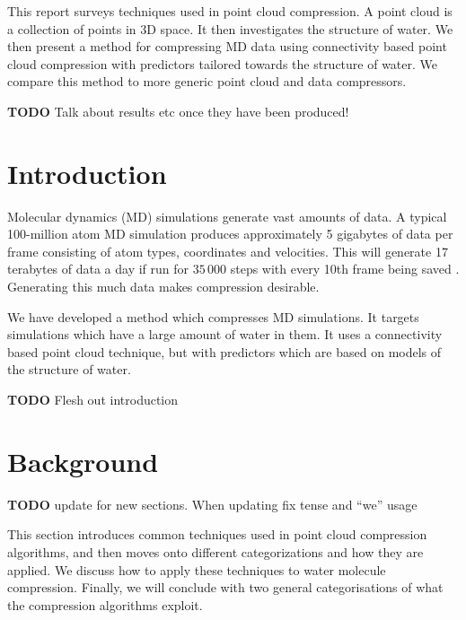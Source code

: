 \documentclass{report}
\newcommand{\todo}{\textbf{TODO} }
\begin{document}
This report surveys techniques used in point cloud compression. A point cloud
is a collection of points in 3D space. It then investigates the structure of
water. We then present a method for compressing MD data using connectivity
based point cloud compression with predictors tailored towards the structure
of water. We compare this method to more generic point cloud and data
compressors.

\todo Talk about results etc once they have been produced!

\tableofcontents

\chapter{Introduction}

Molecular dynamics (MD) simulations generate vast amounts of data. A typical
100-million atom MD simulation produces approximately 5 gigabytes of data per
frame consisting of atom types, coordinates and velocities. This will generate
17 terabytes of data a day if run for $35\,000$ steps with every 10th frame
being saved \citep{omeltchenko2000sls}. Generating this much data makes
compression desirable.

We have developed a method which compresses MD simulations. It targets
simulations which have a large amount of water in them. It uses a connectivity
based point cloud technique, but with predictors which are based on models of
the structure of water.

\todo Flesh out introduction

\chapter{Background}




\todo update for new sections. When updating fix tense and ``we'' usage

This section introduces common techniques used in point cloud compression
algorithms, and then moves onto different categorizations and how they are
applied. We discuss how to apply these techniques to water molecule
compression. Finally, we will conclude with two general categorisations of
what the compression algorithms exploit.
\end{document}
